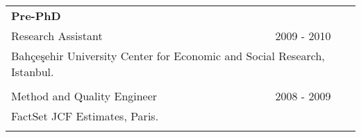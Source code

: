 \documentclass[12 pt]{article}
\begin{document}
\begin{longtable}{ccccc}
\multicolumn{4}{l}{\textbf{Pre-PhD}} \\ 
\multicolumn{4}{l}{Research Assistant}  & \multicolumn{1}{c}{2009 - 2010}   \\


\multicolumn{5}{l}{Bah\c{c}e\c{s}ehir University Center for Economic and Social Research, Istanbul.}   \\
\\

\multicolumn{4}{l}{Method and Quality Engineer}  & \multicolumn{1}{c}{2008 - 2009}   \\
\multicolumn{5}{l}{FactSet JCF Estimates, Paris.} \\
\\


\end{longtable}

 
\end{document}
